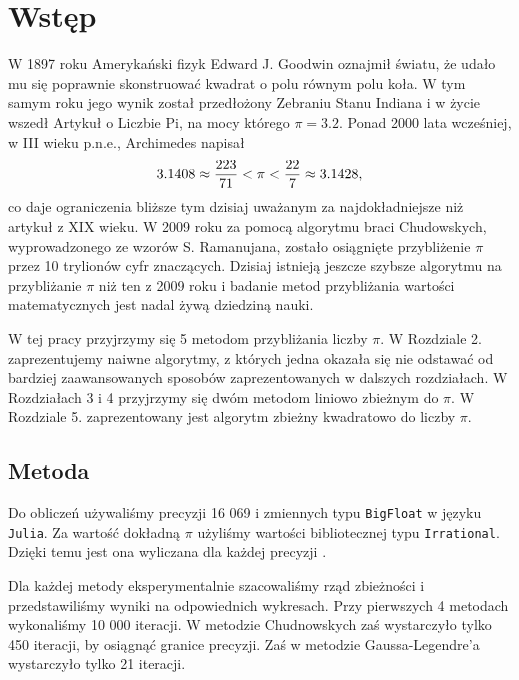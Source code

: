 \documentclass[11pt, wide, leqno]{mwart}
\begin{document}
\maketitle
\tableofcontents

\section{Wstęp}\label{sec:ws}

W 1897 roku Amerykański fizyk Edward J. Goodwin oznajmił światu, że udało mu się poprawnie skonstruować kwadrat o polu równym polu koła. W tym samym roku jego wynik został przedłożony Zebraniu Stanu Indiana i w życie wszedł Artykuł o Liczbie Pi, na mocy którego $\pi=3.2$. Ponad 2000 lata wcześniej, w III wieku p.n.e., Archimedes napisał
$$3.1408\approx{223\over71}<\pi<{22\over7}\approx 3.1428,$$
co daje ograniczenia bliższe tym dzisiaj uważanym za najdokładniejsze niż artykuł z XIX wieku. W 2009 roku za pomocą algorytmu braci Chudowskych, wyprowadzonego ze wzorów S. Ramanujana, zostało osiągnięte przybliżenie $\pi$ przez 10 trylionów cyfr znaczących. Dzisiaj istnieją jeszcze szybsze algorytmu na przybliżanie $\pi$ niż ten z 2009 roku i badanie metod przybliżania wartości matematycznych jest nadal żywą dziedziną nauki.

W tej pracy przyjrzymy się 5 metodom przybliżania liczby $\pi$. W Rozdziale 2. zaprezentujemy naiwne algorytmy, z których jedna okazała się nie odstawać od bardziej zaawansowanych sposobów zaprezentowanych w dalszych rozdziałach. W Rozdziałach 3 i 4 przyjrzymy się dwóm metodom liniowo zbieżnym do $\pi$. W Rozdziale 5. zaprezentowany jest algorytm zbieżny kwadratowo do liczby $\pi$.

\subsection{Metoda}

Do obliczeń używaliśmy precyzji 16 069 i zmiennych typu \verb+BigFloat+ w języku \verb+Julia+. Za wartość dokładną $\pi$ użyliśmy wartości bibliotecznej typu \verb+Irrational+. Dzięki temu jest ona wyliczana dla każdej precyzji \cite{julia}.

Dla każdej metody eksperymentalnie szacowaliśmy rząd zbieżności i przedstawiliśmy wyniki na odpowiednich wykresach. Przy pierwszych 4 metodach wykonaliśmy 10 000 iteracji. W metodzie Chudnowskych zaś wystarczyło tylko 450 iteracji, by osiągnąć granice precyzji. Zaś w metodzie Gaussa-Legendre'a wystarczyło tylko 21 iteracji. 
\end{document}
